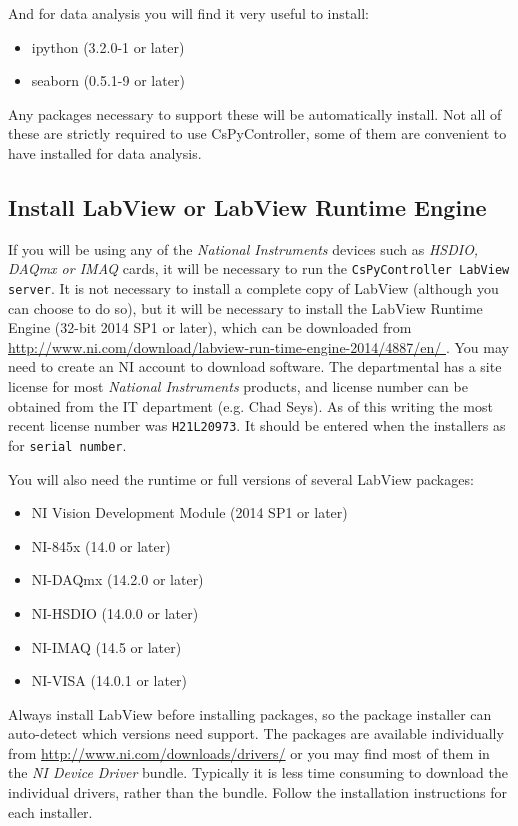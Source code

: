 \documentclass[pdftex,11pt,letterpaper]{article}
\begin{document}
And for data analysis you will find it very useful to install:

\begin{itemize}
\item ipython (3.2.0-1 or later)
\item seaborn (0.5.1-9 or later)
\end{itemize}

Any packages necessary to support these will be automatically install.  Not all of these are strictly required to use CsPyController, some of them are convenient to have installed for data analysis.

\subsection{Install LabView or LabView Runtime Engine}

If you will be using any of the \textit{National Instruments} devices such as \textit{HSDIO, DAQmx or IMAQ} cards, it will be necessary to run the \texttt{CsPyController LabView server}.  It is not necessary to install a complete copy of LabView (although you can choose to do so), but it will be necessary to install the LabView Runtime Engine (32-bit 2014 SP1 or later), which can be downloaded from \url{http://www.ni.com/download/labview-run-time-engine-2014/4887/en/ }.  You may need to create an NI account to download software.  The departmental has a site license for most \textit{National Instruments} products, and license number can be obtained from the IT department (e.g. Chad Seys).  As of this writing the most recent license number was \texttt{H21L20973}.  It should be entered when the installers  as for \texttt{serial number}.

You will also need the runtime or full versions of several LabView packages:

\begin{itemize}
\item NI Vision Development Module (2014 SP1 or later)
\item NI-845x (14.0 or later)
\item NI-DAQmx (14.2.0 or later)
\item NI-HSDIO (14.0.0 or later)
\item NI-IMAQ (14.5 or later)
\item NI-VISA (14.0.1 or later)
\end{itemize}

Always install LabView before installing packages, so the package installer can auto-detect which versions need support.  The packages are available individually from \url{http://www.ni.com/downloads/drivers/} or you may find most of them in the \textit{NI Device Driver} bundle.  Typically it is less time consuming to download the individual drivers, rather than the bundle.  Follow the installation instructions for each installer.
\end{document}
